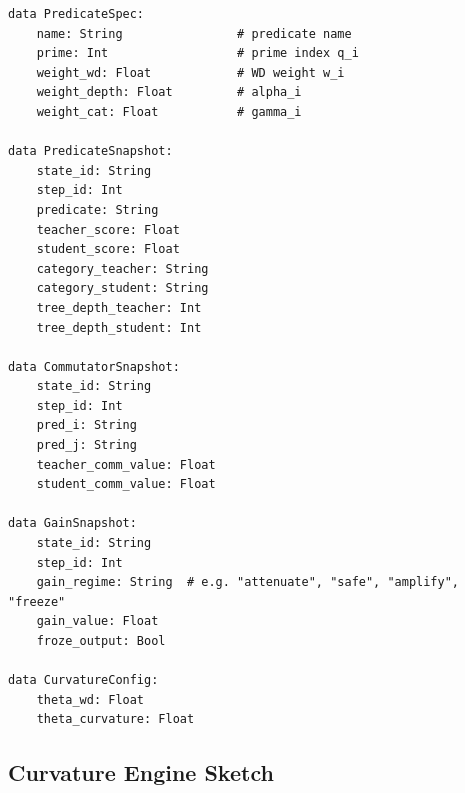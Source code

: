 \documentclass[11pt]{article}
\theoremstyle{definition}
\theoremstyle{plain}
\theoremstyle{remark}
\begin{document}
\begin{verbatim}
data PredicateSpec:
    name: String                # predicate name
    prime: Int                  # prime index q_i
    weight_wd: Float            # WD weight w_i
    weight_depth: Float         # alpha_i
    weight_cat: Float           # gamma_i

data PredicateSnapshot:
    state_id: String
    step_id: Int
    predicate: String
    teacher_score: Float
    student_score: Float
    category_teacher: String
    category_student: String
    tree_depth_teacher: Int
    tree_depth_student: Int

data CommutatorSnapshot:
    state_id: String
    step_id: Int
    pred_i: String
    pred_j: String
    teacher_comm_value: Float
    student_comm_value: Float

data GainSnapshot:
    state_id: String
    step_id: Int
    gain_regime: String  # e.g. "attenuate", "safe", "amplify", "freeze"
    gain_value: Float
    froze_output: Bool

data CurvatureConfig:
    theta_wd: Float
    theta_curvature: Float
\end{verbatim}

\subsection{Curvature Engine Sketch}
\end{document}
